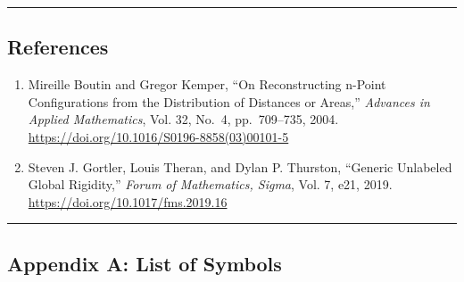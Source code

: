 \documentclass[
  a4paper,
]{article}
\begin{document}
\begin{center}\rule{0.5\linewidth}{0.5pt}\end{center}

\subsection{References}\label{references}

\begin{enumerate}
\def\labelenumi{\arabic{enumi}.}
\item
  Mireille Boutin and Gregor Kemper, ``On Reconstructing n-Point
  Configurations from the Distribution of Distances or Areas,''
  \emph{Advances in Applied Mathematics}, Vol. 32, No.~4, pp.~709--735,
  2004. \url{https://doi.org/10.1016/S0196-8858(03)00101-5}
\item
  Steven J. Gortler, Louis Theran, and Dylan P. Thurston, ``Generic
  Unlabeled Global Rigidity,'' \emph{Forum of Mathematics, Sigma}, Vol.
  7, e21, 2019. \url{https://doi.org/10.1017/fms.2019.16}
\end{enumerate}

\begin{center}\rule{0.5\linewidth}{0.5pt}\end{center}

\subsection{Appendix A: List of
Symbols}\label{appendix-a-list-of-symbols}
\end{document}
